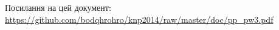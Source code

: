 \documentclass[a4paper,14pt]{article}
\begin{document}

\pagestyle{empty}
\makeatletter
\renewcommand{\@oddhead}{\hfil\thepage}
\makeatother


Посилання на цей документ: \url{https://github.com/bodqhrohro/knp2014/raw/master/doc/pp_pw3.pdf}
\end{document}

